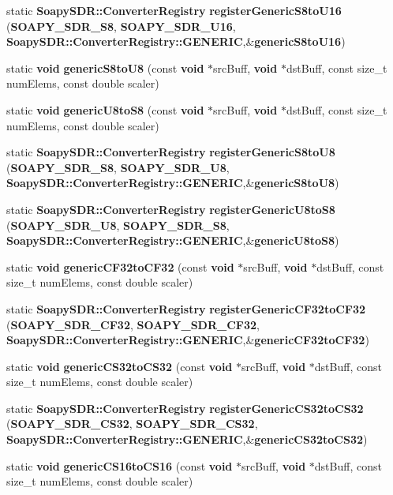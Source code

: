 \begin{DoxyCompactItemize}
\item 
static {\bf Soapy\+S\+D\+R\+::\+Converter\+Registry} {\bf register\+Generic\+S8to\+U16} ({\bf S\+O\+A\+P\+Y\+\_\+\+S\+D\+R\+\_\+\+S8}, {\bf S\+O\+A\+P\+Y\+\_\+\+S\+D\+R\+\_\+\+U16}, {\bf Soapy\+S\+D\+R\+::\+Converter\+Registry\+::\+G\+E\+N\+E\+R\+IC},\&{\bf generic\+S8to\+U16})
\item 
static {\bf void} {\bf generic\+S8to\+U8} (const {\bf void} $\ast$src\+Buff, {\bf void} $\ast$dst\+Buff, const size\+\_\+t num\+Elems, const double scaler)
\item 
static {\bf void} {\bf generic\+U8to\+S8} (const {\bf void} $\ast$src\+Buff, {\bf void} $\ast$dst\+Buff, const size\+\_\+t num\+Elems, const double scaler)
\item 
static {\bf Soapy\+S\+D\+R\+::\+Converter\+Registry} {\bf register\+Generic\+S8to\+U8} ({\bf S\+O\+A\+P\+Y\+\_\+\+S\+D\+R\+\_\+\+S8}, {\bf S\+O\+A\+P\+Y\+\_\+\+S\+D\+R\+\_\+\+U8}, {\bf Soapy\+S\+D\+R\+::\+Converter\+Registry\+::\+G\+E\+N\+E\+R\+IC},\&{\bf generic\+S8to\+U8})
\item 
static {\bf Soapy\+S\+D\+R\+::\+Converter\+Registry} {\bf register\+Generic\+U8to\+S8} ({\bf S\+O\+A\+P\+Y\+\_\+\+S\+D\+R\+\_\+\+U8}, {\bf S\+O\+A\+P\+Y\+\_\+\+S\+D\+R\+\_\+\+S8}, {\bf Soapy\+S\+D\+R\+::\+Converter\+Registry\+::\+G\+E\+N\+E\+R\+IC},\&{\bf generic\+U8to\+S8})
\item 
static {\bf void} {\bf generic\+C\+F32to\+C\+F32} (const {\bf void} $\ast$src\+Buff, {\bf void} $\ast$dst\+Buff, const size\+\_\+t num\+Elems, const double scaler)
\item 
static {\bf Soapy\+S\+D\+R\+::\+Converter\+Registry} {\bf register\+Generic\+C\+F32to\+C\+F32} ({\bf S\+O\+A\+P\+Y\+\_\+\+S\+D\+R\+\_\+\+C\+F32}, {\bf S\+O\+A\+P\+Y\+\_\+\+S\+D\+R\+\_\+\+C\+F32}, {\bf Soapy\+S\+D\+R\+::\+Converter\+Registry\+::\+G\+E\+N\+E\+R\+IC},\&{\bf generic\+C\+F32to\+C\+F32})
\item 
static {\bf void} {\bf generic\+C\+S32to\+C\+S32} (const {\bf void} $\ast$src\+Buff, {\bf void} $\ast$dst\+Buff, const size\+\_\+t num\+Elems, const double scaler)
\item 
static {\bf Soapy\+S\+D\+R\+::\+Converter\+Registry} {\bf register\+Generic\+C\+S32to\+C\+S32} ({\bf S\+O\+A\+P\+Y\+\_\+\+S\+D\+R\+\_\+\+C\+S32}, {\bf S\+O\+A\+P\+Y\+\_\+\+S\+D\+R\+\_\+\+C\+S32}, {\bf Soapy\+S\+D\+R\+::\+Converter\+Registry\+::\+G\+E\+N\+E\+R\+IC},\&{\bf generic\+C\+S32to\+C\+S32})
\item 
static {\bf void} {\bf generic\+C\+S16to\+C\+S16} (const {\bf void} $\ast$src\+Buff, {\bf void} $\ast$dst\+Buff, const size\+\_\+t num\+Elems, const double scaler)

\end{DoxyCompactItemize}
